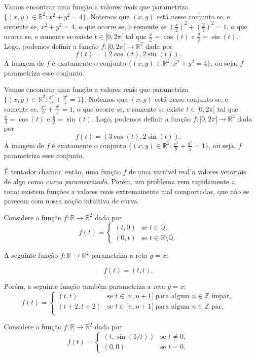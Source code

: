 \begin{example}
    Vamos encontrar uma função a valores reais que parametriza $\{(x, y)\in \mathbb R^2:x^2+y^2=4\}$.
    Notemos que $(x, y)$ está nesse conjunto se, e somente se, $x^2+y^2=4$, o que ocorre se, e somente se $(\frac{x}{2})^2+(\frac{y}{2})^2=1$, o que ocorre se, e somente se existe $t\in [0, 2\pi[$ tal que $\frac{x}{2}=\cos(t)$ e $\frac{y}{2}=\sin(t)$.
    Logo, podemos definir a função $f:[0, 2\pi[\rightarrow \mathbb R^2$ dada por
    \[
        f(t) = (2\cos(t), 2\sin(t)).
    \]
    A imagem de $f$ é exatamente o conjunto $\{(x, y)\in \mathbb R^2:x^2+y^2=4\}$, ou seja, $f$ parametriza esse conjunto.
\end{example}

\begin{example}
    Vamos encontrar uma função a valores reais que parametriza $\{(x, y)\in \mathbb R^2:\frac{x^2}{9}+\frac{y^2}{4}=1\}$.
    Notemos que $(x, y)$ está nesse conjunto se, e somente se, $\frac{x^2}{9}+\frac{y^2}{4}=1$, o que ocorre se, e somente se existe $t\in [0, 2\pi[$ tal que $\frac{x}{3}=\cos(t)$ e $\frac{y}{2}=\sin(t)$.
    Logo, podemos definir a função $f:[0, 2\pi[\rightarrow \mathbb R^2$ dada por
    \[
        f(t) = (3\cos(t), 2\sin(t)).
    \]
    A imagem de $f$ é exatamente o conjunto $\{(x, y)\in \mathbb R^2:\frac{x^2}{9}+\frac{y^2}{4}=1\}$, ou seja, $f$ parametriza esse conjunto.
\end{example}

É tentador chamar, então, uma função $f$ de uma variável real a valores vetoriais de algo como \emph{curva parametrizada}. Porém, um problema vem rapidamente a tona: existem funções a valores reais extremamente mal comportadas, que não se parecem com nossa noção intuitiva de curva.

\begin{example}
    Considere a função $f:\mathbb R\rightarrow \mathbb R^2$ dada por
    \[
        f(t) = \begin{cases}
            (t, 0) & \text{se } t\in \mathbb Q,\\
            (0, t) & \text{se } t\in \mathbb R\setminus \mathbb Q.
        \end{cases}
    \]
\end{example}
\begin{example}
    A seguinte função $f:\mathbb R\rightarrow \mathbb R^2$ parametriza a reta $y=x$:

    \[
        f(t) = (t, t).
    \]

    Porém, a seguinte função também parametriza a reta $y=x$:
    \[
        f(t) = \begin{cases}
            (t, t) & \text{se } t\in [n, n+1[ \text{ para algum } n\in \mathbb Z \text{ ímpar},\\
            (t+2, t+2) & \text{se } t\in [n, n+1[ \text{ para algum } n\in \mathbb Z \text{ par},\\
        \end{cases}
    \]
\end{example}

\begin{example}
    Considere a função $f:\mathbb R\rightarrow \mathbb R^2$ dada por
    \[
        f(t) = \begin{cases}
            (t, \sin(1/t)) & \text{se } t \neq 0,\\
            (0, 0) & \text{se } t=0.
        \end{cases}
    \]
\end{example}